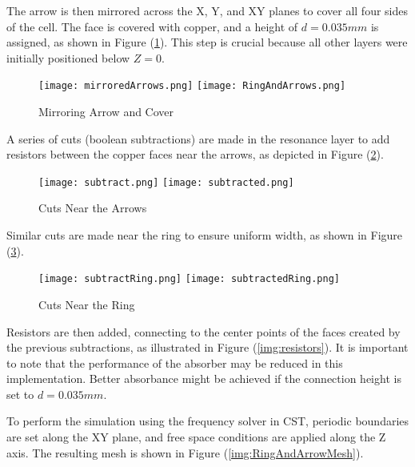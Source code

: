         The arrow is then mirrored across the X, Y, and XY planes to cover all
        four sides of the cell. The face is covered with copper, and a height of 
        $d=0.035 mm$ is assigned, as shown in Figure (\ref{img:mirrorAndCover}).
        This step is crucial because all other layers were initially positioned 
        below $Z=0$.
        \begin{figure}[h]
            \centering
            \texttt{[image: mirroredArrows.png]}\hfil
            \texttt{[image: RingAndArrows.png]}
            \caption{Mirroring Arrow and Cover}
            \label{img:mirrorAndCover}
        \end{figure}

        A series of cuts (boolean subtractions) are made in the resonance layer
        to add resistors between the copper faces near the arrows, as depicted 
        in Figure (\ref{img:arrowCuts}).
        \begin{figure}[h]
            \centering
            \texttt{[image: subtract.png]}\hfil
            \texttt{[image: subtracted.png]}
            \caption{Cuts Near the Arrows}
            \label{img:arrowCuts}
        \end{figure}

        Similar cuts are made near the ring to ensure uniform width, as shown 
        in Figure (\ref{img:ringCuts}).
        \begin{figure}[h]
            \centering
            \texttt{[image: subtractRing.png]}\hfil
            \texttt{[image: subtractedRing.png]}
            \caption{Cuts Near the Ring}
            \label{img:ringCuts}
        \end{figure}

        Resistors are then added, connecting to the center points of the faces
        created by the previous subtractions, as illustrated in Figure 
        (\ref{img:resistors}). It is important to note that the performance of 
        the absorber may be reduced in this implementation. Better absorbance 
        might be achieved if the connection height is set to $d=0.035mm$.

        To perform the simulation using the frequency solver in CST, periodic 
        boundaries are set along the XY plane, and free space conditions are 
        applied along the Z axis. The resulting mesh is shown in Figure 
        (\ref{img:RingAndArrowMesh}).
        
